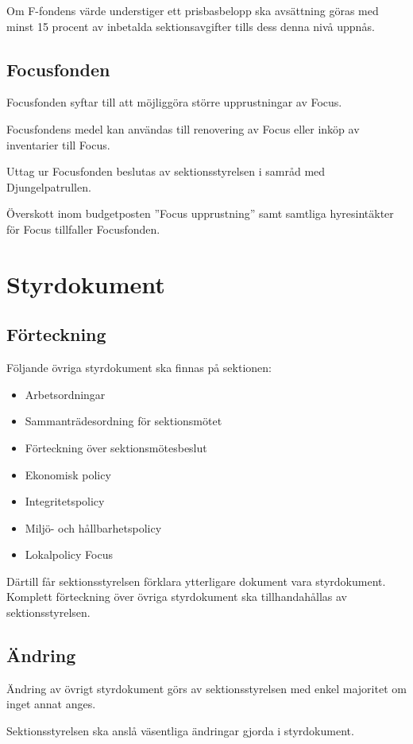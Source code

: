 \documentclass{styrdokument}
\begin{document}
\? Om F-fondens värde understiger ett prisbasbelopp ska avsättning göras med minst 15 procent av inbetalda sektionsavgifter tills dess denna nivå uppnås.

\subsection*{Focusfonden}
\? Focusfonden syftar till att möjliggöra större upprustningar av Focus.

\? Focusfondens medel kan användas till renovering av Focus eller inköp av inventarier till Focus.

\? Uttag ur Focusfonden beslutas av sektionsstyrelsen i samråd med Djungelpatrullen.

\? Överskott inom budgetposten ''Focus upprustning'' samt samtliga hyresintäkter för Focus tillfaller Focusfonden.



\section{Styrdokument}
\subsection{Förteckning}
\? Följande övriga styrdokument ska finnas på sektionen:
\begin{itemize}
    \item Arbetsordningar
    \item Sammanträdesordning för sektionsmötet
    \item Förteckning över sektionsmötesbeslut
    \item Ekonomisk policy
    \item Integritetspolicy
    \item Miljö- och hållbarhetspolicy
    \item Lokalpolicy Focus
\end{itemize}

\? Därtill får sektionsstyrelsen förklara ytterligare dokument vara styrdokument.
Komplett förteckning över övriga styrdokument ska tillhandahållas av sektionsstyrelsen.

\subsection{Ändring}
\? Ändring av övrigt styrdokument görs av sektionsstyrelsen med enkel majoritet om inget annat anges.

\? Sektionsstyrelsen ska anslå väsentliga ändringar gjorda i styrdokument.
\end{document}
